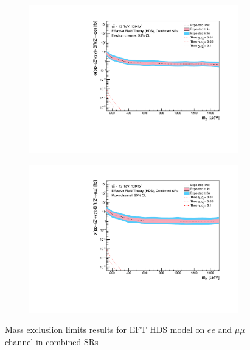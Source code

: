 \documentclass[12pt, a4paper]{book}
\begin{document}
\begin{figure}[!ht]
	\centering
	\begin{subfigure}[b]{0.49\textwidth}
      \centering
      \includegraphics[width=1\textwidth]{Limits/Model_independent/EFT_HDS/mass_exclusion_ee.pdf}
   \end{subfigure}
   \hfill
   \begin{subfigure}[b]{0.49\textwidth}
      \centering
      \includegraphics[width=1\textwidth]{Limits/Model_independent/EFT_HDS/mass_exclusion_uu.pdf}
   \end{subfigure}
   \caption{Mass exclusiion limits results for EFT HDS model on $ee$ and $\mu\mu$ channel in combined SRs}\label{fig:EFT_HDS_me_comb}
\end{figure}
\clearpage
\end{document}
